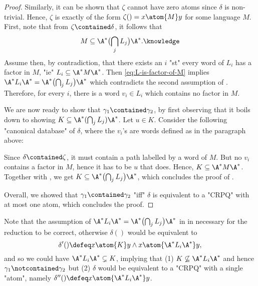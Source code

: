 \begin{proof}
		Similarly, it can be shown that $\zeta$ cannot have zero atoms since $\delta$ is non-trivial. 
		Hence, $\zeta$ is exactly of the form $\zeta() = x \atom{M} y$ for some language $M$.
		First, note that from $\zeta \contained \delta$, it follows that
		\begin{equation}
			M \subseteq \A^* \bigl( \bigcap_j L_j \bigr) \A^*.
			\AP\label{eq:L-is-factor-of-M}
		\end{equation}
		Assume then, by contradiction, that there
		exists an $i$ "st" every word of $L_i$ has a factor in $M$,
		"ie" $L_i \subseteq \A^* M \A^*$. Then \eqref{eq:L-is-factor-of-M} implies
		$\A^* L_i \A^* = \A^* \bigl( \bigcap_j L_j \bigr) \A^*$ which contradicts
		the second assumption of .
		Therefore, for every $i$, there is a word $v_i \in L_i$ which contains no factor in $M$.
		
		We are now ready to show that $\gamma_1 \contained \gamma_2$, by first observing that
		it boils down to showing $K \subseteq \A^* (\bigcap_j L_j ) \A^*$. Let $u \in K$.
		Consider the following "canonical database" of $\delta$, where the $v_i$'s are words
		defined as in the paragraph above:
		\begin{center}
		\end{center}
		Since $\delta \contained \zeta$, it must contain a path labelled by a word of $M$.
		But no $v_i$ contains a factor in $M$, hence it has to be $u$ that does.
		Hence, $K \subseteq \A^* M \A^*$. Together with
		, we get $K \subseteq \A^* \bigl( \bigcap_j L_j \bigr) \A^*$,
		which concludes the proof of .
	
		Overall, we showed that $\gamma_1 \contained \gamma_2$ "iff"
		$\delta$ is equivalent to a "CRPQ" with at most one atom, which concludes the proof.
\end{proof}

Note that the assumption of $\A^* L_i \A^* = \A^* \bigl( \bigcap_j L_j\bigr) \A^*$
in  in necessary for the reduction to be correct,
otherwise $\delta()$ would be equivalent to
\[\delta'() \defeq x \atom{K} y \land x \atom{\A^* L_i \A^*} y,\]
and so we could have $\A^* L_i \A^* \subsetneq K$, implying that
(1) $K \not\subseteq \A^* L_i \A^*$ and hence $\gamma_1 \notcontained \gamma_2$
but (2) $\delta$ would be equivalent to a "CRPQ" with a single "atom", namely
$\delta''() \defeq x\atom{\A^* L_i \A^*} y$.


